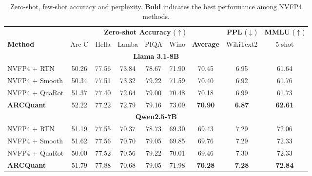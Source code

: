 \documentclass[11pt]{article}
\begin{document}
\begin{table}[t]
\centering
\caption{Zero-shot, few-shot accuracy and perplexity. \textbf{Bold} indicates the best performance among NVFP4 methods.}
\label{tab:nvfp4}
\begin{tabular}{l|cccccc|c|c}
\toprule
 & \multicolumn{6}{c|}{\textbf{Zero-shot Accuracy} ($\uparrow$)} & \textbf{PPL} ($\downarrow$) & \textbf{MMLU} ($\uparrow$) \\
\textbf{Method} & Arc-C & Hella & Lamba & PIQA & Wino & \textbf{Average} & WikiText2 & 5-shot \\
\midrule
\multicolumn{9}{c}{\textbf{Llama 3.1-8B}} \\
\midrule
NVFP4 + RTN         & 50.26 & 77.56 & 73.84 & 78.67 & 71.90 & 70.45 & 6.95 & 61.64 \\
NVFP4 + Smooth & 50.34 & 77.51 & 73.32 & 79.22 & 71.59 & 70.40 & 6.92 & 61.76 \\
NVFP4 + QuaRot      & 51.37 & 77.40 & 72.64 & 79.00 & 70.48 & 70.18 & 6.99 & 61.73 \\
\rowcolor{lightpink} \textbf{ARCQuant} & 52.22 & 77.22 & 72.79 & 79.16 & 73.09 & \textbf{70.90} & \textbf{6.87} & \textbf{62.61} \\

\midrule \midrule %

\multicolumn{9}{c}{\textbf{Qwen2.5-7B}} \\
\midrule
NVFP4 + RTN         & 51.19 & 77.55 & 70.37 & 78.73 & 69.30 & 69.43 & 7.29 & 72.06 \\
NVFP4 + Smooth & 51.62 & 77.56 & 70.70 & 79.05 & 69.85 & 69.76 & 7.29 & 72.33 \\
NVFP4 + QuaRot      & 50.00 & 77.52 & 70.56 & 79.22 & 70.01 & 69.46 & 7.30 & 72.33 \\
\rowcolor{lightpink} \textbf{ARCQuant} & 51.79 & 77.88 & 70.68 & 79.05 & 71.98 & \textbf{70.28} & \textbf{7.28} & \textbf{72.84} \\
\bottomrule
\end{tabular}
\end{table}



\end{document}
